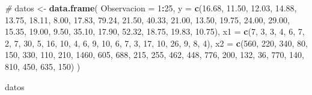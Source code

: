\documentclass[
]{book}
\newenvironment{Shaded}{\begin{snugshade}}{\end{snugshade}}
\newcommand{\AttributeTok}[1]{\textcolor[rgb]{0.13,0.29,0.53}{#1}}
\newcommand{\CommentTok}[1]{\textcolor[rgb]{0.56,0.35,0.01}{\textit{#1}}}
\newcommand{\DecValTok}[1]{\textcolor[rgb]{0.00,0.00,0.81}{#1}}
\newcommand{\FloatTok}[1]{\textcolor[rgb]{0.00,0.00,0.81}{#1}}
\newcommand{\FunctionTok}[1]{\textcolor[rgb]{0.13,0.29,0.53}{\textbf{#1}}}
\newcommand{\NormalTok}[1]{#1}
\newcommand{\OtherTok}[1]{\textcolor[rgb]{0.56,0.35,0.01}{#1}}
\newcommand{\SpecialCharTok}[1]{\textcolor[rgb]{0.81,0.36,0.00}{\textbf{#1}}}
\begin{document}
\begin{Shaded}
\begin{Highlighting}[]
\CommentTok{\# }
\NormalTok{datos }\OtherTok{\textless{}{-}} \FunctionTok{data.frame}\NormalTok{(}
  \AttributeTok{Observacion =} \DecValTok{1}\SpecialCharTok{:}\DecValTok{25}\NormalTok{,}
  \AttributeTok{y =} \FunctionTok{c}\NormalTok{(}\FloatTok{16.68}\NormalTok{, }\FloatTok{11.50}\NormalTok{, }\FloatTok{12.03}\NormalTok{, }\FloatTok{14.88}\NormalTok{, }\FloatTok{13.75}\NormalTok{,}
        \FloatTok{18.11}\NormalTok{, }\FloatTok{8.00}\NormalTok{, }\FloatTok{17.83}\NormalTok{, }\FloatTok{79.24}\NormalTok{, }\FloatTok{21.50}\NormalTok{,}
        \FloatTok{40.33}\NormalTok{, }\FloatTok{21.00}\NormalTok{, }\FloatTok{13.50}\NormalTok{, }\FloatTok{19.75}\NormalTok{, }\FloatTok{24.00}\NormalTok{,}
        \FloatTok{29.00}\NormalTok{, }\FloatTok{15.35}\NormalTok{, }\FloatTok{19.00}\NormalTok{, }\FloatTok{9.50}\NormalTok{, }\FloatTok{35.10}\NormalTok{,}
        \FloatTok{17.90}\NormalTok{, }\FloatTok{52.32}\NormalTok{, }\FloatTok{18.75}\NormalTok{, }\FloatTok{19.83}\NormalTok{, }\FloatTok{10.75}\NormalTok{),}
  \AttributeTok{x1 =} \FunctionTok{c}\NormalTok{(}\DecValTok{7}\NormalTok{, }\DecValTok{3}\NormalTok{, }\DecValTok{3}\NormalTok{, }\DecValTok{4}\NormalTok{, }\DecValTok{6}\NormalTok{,}
         \DecValTok{7}\NormalTok{, }\DecValTok{2}\NormalTok{, }\DecValTok{7}\NormalTok{, }\DecValTok{30}\NormalTok{, }\DecValTok{5}\NormalTok{,}
         \DecValTok{16}\NormalTok{, }\DecValTok{10}\NormalTok{, }\DecValTok{4}\NormalTok{, }\DecValTok{6}\NormalTok{, }\DecValTok{9}\NormalTok{,}
         \DecValTok{10}\NormalTok{, }\DecValTok{6}\NormalTok{, }\DecValTok{7}\NormalTok{, }\DecValTok{3}\NormalTok{, }\DecValTok{17}\NormalTok{,}
         \DecValTok{10}\NormalTok{, }\DecValTok{26}\NormalTok{, }\DecValTok{9}\NormalTok{, }\DecValTok{8}\NormalTok{, }\DecValTok{4}\NormalTok{),}
  \AttributeTok{x2 =} \FunctionTok{c}\NormalTok{(}\DecValTok{560}\NormalTok{, }\DecValTok{220}\NormalTok{, }\DecValTok{340}\NormalTok{, }\DecValTok{80}\NormalTok{, }\DecValTok{150}\NormalTok{,}
         \DecValTok{330}\NormalTok{, }\DecValTok{110}\NormalTok{, }\DecValTok{210}\NormalTok{, }\DecValTok{1460}\NormalTok{, }\DecValTok{605}\NormalTok{,}
         \DecValTok{688}\NormalTok{, }\DecValTok{215}\NormalTok{, }\DecValTok{255}\NormalTok{, }\DecValTok{462}\NormalTok{, }\DecValTok{448}\NormalTok{,}
         \DecValTok{776}\NormalTok{, }\DecValTok{200}\NormalTok{, }\DecValTok{132}\NormalTok{, }\DecValTok{36}\NormalTok{, }\DecValTok{770}\NormalTok{,}
         \DecValTok{140}\NormalTok{, }\DecValTok{810}\NormalTok{, }\DecValTok{450}\NormalTok{, }\DecValTok{635}\NormalTok{, }\DecValTok{150}\NormalTok{)}
\NormalTok{)}

\NormalTok{datos}
\end{Highlighting}
\end{Shaded}
\end{document}
